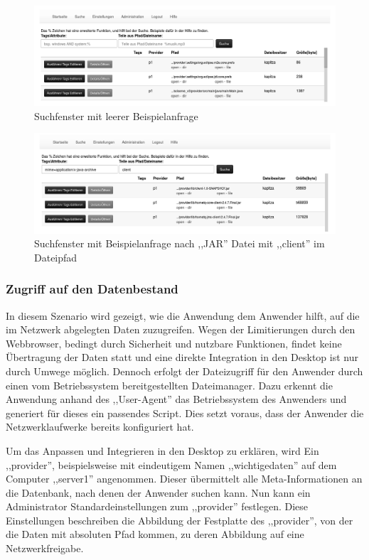 \documentclass[oneside, ngerman, toc=bibliography,bibliography=totoc,listof=entryprefix, open=right,numbers=noenddot,fontsize=12pt]{scrbook}
\begin{document}
\begin{figure}[htbp] 
    \centering
    \includegraphics[width=\textwidth]{Masterarbeit_Bilder/www_suche.png}
    \caption{Suchfenster mit leerer Beispielanfrage}
    \label{fig:www-suche}
\end{figure}  

\begin{figure}[htbp] 
    \centering
    \includegraphics[width=\textwidth]{Masterarbeit_Bilder/www_suche2.png}
    \caption{Suchfenster mit Beispielanfrage nach ,,JAR'' Datei mit ,,client'' im Dateipfad}
    \label{fig:www-suche2}
\end{figure}  

 
\subsubsection{Zugriff auf den Datenbestand}
In diesem Szenario wird gezeigt, wie die Anwendung dem Anwender hilft, auf die im Netzwerk abgelegten Daten zuzugreifen. Wegen der Limitierungen durch den Webbrowser, bedingt durch Sicherheit und nutzbare Funktionen, findet keine Übertragung der Daten statt und eine direkte Integration in den Desktop ist nur durch Umwege möglich.
Dennoch erfolgt der Dateizugriff für den Anwender  durch einen vom Betriebssystem bereitgestellten Dateimanager. 
Dazu erkennt die Anwendung anhand des ,,User-Agent'' das Betriebssystem des Anwenders und generiert für dieses ein passendes Script. Dies setzt voraus, dass der Anwender die Netzwerklaufwerke bereits konfiguriert hat.

Um das Anpassen und Integrieren in den Desktop zu erklären, wird Ein ,,provider'', beispielsweise mit eindeutigem Namen ,,wichtigedaten'' auf dem Computer ,,server1'' angenommen. Dieser übermittelt alle Meta-Informationen an die Datenbank, nach denen der Anwender suchen kann. Nun kann ein Administrator Standardeinstellungen zum ,,provider'' festlegen. Diese Einstellungen beschreiben die Abbildung der Festplatte des ,,provider'', von der die Daten mit absoluten Pfad kommen, zu deren Abbildung auf eine Netzwerkfreigabe.
\end{document}
